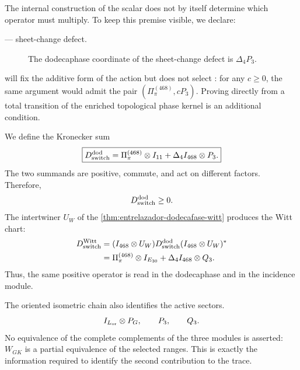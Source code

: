 The internal construction of the scalar does not by itself determine which operator
must multiply. To keep this premise visible, we declare:
\begin{description}
  \item[\HDef --- sheet-change defect.] The dodecaphase coordinate of the
  sheet-change defect is \(\Delta_4P_3\).
\end{description}
\HAdd will fix the additive form of the action but does not select \HDef: for any
\(c\ge0\), the same argument would admit the pair
\((\Pi_\pi^{(468)},cP_3)\). Proving \HDef directly from a total transition
of the enriched topological phase kernel is an additional condition.

We define the Kronecker sum
\[
 \boxed{
 D_{\rm switch}^{\rm dod}
 =\Pi_\pi^{(468)}\otimes I_{11}
 +\Delta_4 I_{468}\otimes P_3.
 }
\]
The two summands are positive, commute, and act on different factors.
Therefore,
\[
 D_{\rm switch}^{\rm dod}\ge0.
\]
The intertwiner \(U_W\) of the
\cref{thm:entrelazador-dodecafase-witt} produces the Witt chart:
\[
\begin{aligned}
 D_{\rm switch}^{\rm Witt}
 &=(I_{468}\otimes U_W)
 D_{\rm switch}^{\rm dod}
 (I_{468}\otimes U_W)^*\\
 &=\Pi_\pi^{(468)}\otimes I_{E_{30}}
 +\Delta_4I_{468}\otimes Q_3.
\end{aligned}
\]
Thus, the same positive operator is read in the dodecaphase and in the
incidence module.

The oriented isometric chain also identifies the active sectors.
\[
 I_{L_{\rm or}}\otimes P_G,\qquad P_3,\qquad Q_3.
\]
No equivalence of the complete complements of the three
modules is asserted: \(W_{GK}\) is a partial equivalence of the selected
ranges. This is exactly the information required to identify
the second contribution to the trace.

